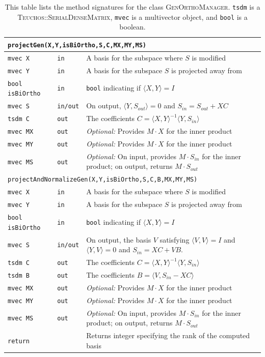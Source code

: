 \documentclass[12pt,letterpaper]{SANDreport}
\theoremstyle{example}
\newcommand{\inner}[2]{\langle #1,#2 \rangle}
\newenvironment{argtable}[4]{
   \begin{table}[ht]
     \label{#4}
     \centering
     \caption[#1]{#2}
     \begin{tabular}{|l|l|p{#3}|}
}
{
    \hline
    \end{tabular}
    \end{table}
}
\newcommand{\atmethod}[1]{\hline\hline\multicolumn{3}{|l|}{\tt{#1}}\\\hline}
\newcommand{\atargument}[3]{\texttt{#1}&\texttt{#2}&#3\\}
\begin{document}
\begin{argtable}{Proposed GenOrthoManager Class Methods}{This table lists the method signatures for the class
  \textsc{GenOrthoManager}. \texttt{tsdm} is a \textsc{Teuchos::SerialDenseMatrix},
  \texttt{mvec} is a multivector object, and \texttt{bool} is a boolean.}{10cm}{tbl:proposed_code}

  \atmethod{projectGen(X,Y,isBiOrtho,S,C,MX,MY,MS)}
  \atargument{mvec X}{in}{A basis for the subspace where $S$ is modified}
  \atargument{mvec Y}{in}{A basis for the subspace $S$ is projected away from}
  \atargument{bool isBiOrtho}{in}{\texttt{bool} indicating if $\inner{X}{Y}=I$}
  \atargument{mvec S}{in/out}{On output, $\inner{Y}{S_{out}} = 0$ and $S_{in} = S_{out} + XC$}
  \atargument{tsdm C}{out}{The coefficients $C = \inner{X}{Y}^{-1} \inner{Y}{S_{in}}$}
  \atargument{mvec MX}{out}{\textit{Optional:} Provides $M \cdot X$ for the inner product}
  \atargument{mvec MY}{out}{\textit{Optional:} Provides $M \cdot X$ for the inner product}
  \atargument{mvec MS}{out}{\textit{Optional:} On input, provides $M \cdot S_{in}$ for the inner product;  on output, returns $M \cdot S_{out}$}

  \atmethod{projectAndNormalizeGen(X,Y,isBiOrtho,S,C,B,MX,MY,MS)}
  \atargument{mvec X}{in}{A basis for the subspace where $S$ is modified}
  \atargument{mvec Y}{in}{A basis for the subspace $S$ is projected away from}
  \atargument{bool isBiOrtho}{in}{\texttt{bool} indicating if $\inner{X}{Y}=I$}
  \atargument{mvec S}{in/out}{On output, the basis $V$ satisfying $\inner{V}{V}=I$ and $\inner{Y}{V}=0$ and $S_{in} = XC + VB$.}
  \atargument{tsdm C}{out}{The coefficients $C = \inner{X}{Y}^{-1} \inner{Y}{S_{in}}$}
  \atargument{tsdm B}{out}{The coefficients $B = \inner{V}{S_{in}-XC}$}
  \atargument{mvec MX}{out}{\textit{Optional:} Provides $M \cdot X$ for the inner product}
  \atargument{mvec MY}{out}{\textit{Optional:} Provides $M \cdot X$ for the inner product}
  \atargument{mvec MS}{out}{\textit{Optional:} On input, provides $M \cdot S_{in}$ for the inner product;  on output, returns $M \cdot S_{out}$}
  \atargument{return}{}{Returns integer specifying the rank of the computed basis}

\end{argtable}
\end{document}
